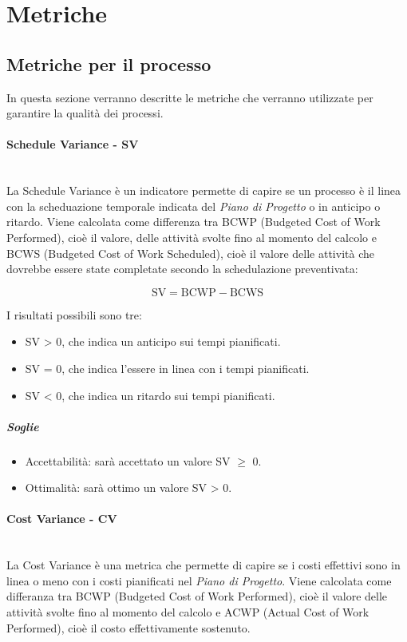 \pagebreak
\section{Metriche}
\label{AppB:metric}
\subsection{Metriche per il processo}
\label{AppB:metricheProc}
In questa sezione verranno descritte le metriche che verranno utilizzate per garantire la qualità dei processi.

\paragraph{Schedule Variance - SV}
	~\\La Schedule Variance è un indicatore permette di capire se un processo è il linea con la scheduazione temporale indicata del \emph{Piano di Progetto} o in anticipo o ritardo. Viene calcolata come differenza tra BCWP (Budgeted Cost of Work Performed), cioè il valore, delle attività svolte fino al momento del calcolo e BCWS (Budgeted Cost of Work Scheduled), cioè il valore delle attività che dovrebbe essere state completate secondo la schedulazione preventivata:
	
	\begin{displaymath}
\mbox{SV}= \mbox{BCWP}-\mbox{BCWS}
\end{displaymath}

I risultati possibili sono tre:

\begin{itemize}
\item SV > 0, che indica un anticipo sui tempi pianificati.
\item SV = 0, che indica l'essere in linea con i tempi pianificati.
\item SV < 0, che indica un ritardo sui tempi pianificati.
\end{itemize}

\subparagraph{Soglie}
\begin{itemize}
\item Accettabilità: sarà accettato un valore SV $\ge$ 0.
\item Ottimalità: sarà ottimo un valore SV > 0.
\end{itemize}
	
\paragraph{Cost Variance - CV}
	~\\La Cost Variance è una metrica che permette di capire se i costi effettivi sono in linea o meno con i costi pianificati nel \emph{Piano di Progetto}. Viene calcolata come differanza tra BCWP (Budgeted Cost of Work Performed), cioè il valore delle attività svolte fino al momento del calcolo e ACWP (Actual Cost of Work Performed), cioè il costo effettivamente sostenuto. 
	
